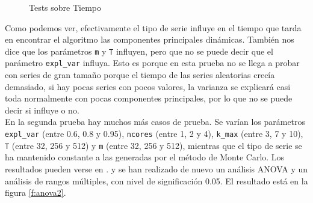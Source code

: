 \begin{figure}
 \centering
    \newline
    \centering
 \caption{Tests sobre Tiempo}
 \label{f:anova1}
\end{figure}

Como podemos ver, efectivamente el tipo de serie influye en el tiempo que tarda en encontrar el algoritmo las componentes principales dinámicas. También nos dice que los parámetros \texttt{m} y \texttt{T} influyen, pero que no se puede decir que el parámetro \texttt{expl\_var} influya. Esto es porque en esta prueba no se llega a probar con series de gran tamaño porque el tiempo de las series aleatorias crecía demasiado, si hay pocas series con pocos valores, la varianza se explicará casi toda normalmente con pocas componentes principales, por lo que no se puede decir si influye o no.\\

En la segunda prueba hay muchos más casos de prueba. Se varían los parámetros \texttt{expl\_var} (entre 0.6, 0.8 y 0.95), \texttt{ncores} (entre 1, 2 y 4), \texttt{k\_max} (entre 3, 7 y 10), \texttt{T} (entre 32, 256 y 512) y \texttt{m} (entre 32, 256 y 512), mientras que el tipo de serie se ha mantenido constante a las generadas por el método de Monte Carlo. Los resultados pueden verse en \cite{anabel}.
y se han realizado de nuevo un análisis ANOVA y un análisis de rangos múltiples, con nivel de significación 0.05. El resultado está en la figura \ref{f:anova2}.\\

